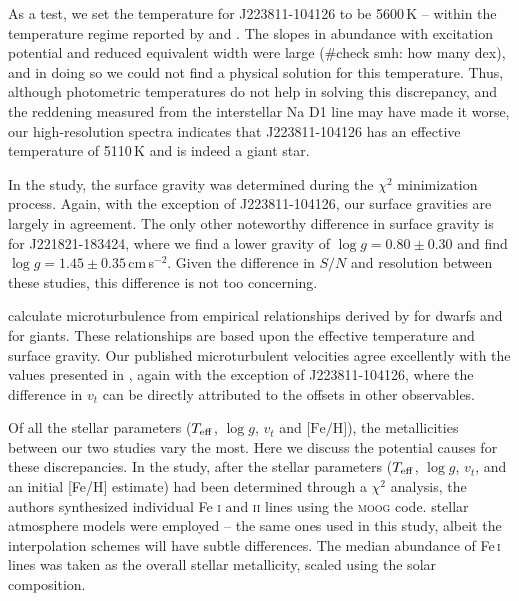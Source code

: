\documentclass{emulateapj}
\begin{document}
As a test, we set the temperature for J223811-104126 to be 5600\,K -- within the temperature regime reported by \citet{williams;et-al_2011} and \citet{wylie-de-boer;et-al_2012}. The slopes in abundance with excitation potential and reduced equivalent width were large (\#check smh: how many dex), and in doing so we could not find a physical solution for this temperature. Thus, although photometric temperatures do not help in solving this discrepancy, and the reddening measured from the interstellar Na D1 line may have made it worse, our high-resolution spectra indicates that J223811-104126 has an effective temperature of 5110\,K and is indeed a giant star.

In the \citet{wylie-de-boer;et-al_2012} study, the surface gravity was determined during the $\chi^2$ minimization process. Again, with the exception of J223811-104126, our surface gravities are largely in agreement. The only other noteworthy difference in surface gravity is for J221821-183424, where we find a lower gravity of $\log{g} = 0.80 \pm 0.30$ and \citet{wylie-de-boer;et-al_2012} find $\log{g} = 1.45 \pm 0.35$\,cm\,s$^{-2}$. Given the difference in $S/N$ and resolution between these studies, this difference is not too concerning. 

\citet{wylie-de-boer;et-al_2012} calculate microturbulence from empirical relationships derived by \citet{reddy;et-al_2003} for dwarfs and \citet{fulbright_2000} for giants. These relationships are based upon the effective temperature and surface gravity. Our published microturbulent velocities agree excellently with the values presented in \citet{wylie-de-boer;et-al_2012}, again with the exception of J223811-104126, where the difference in $v_{t}$ can be directly attributed to the offsets in other observables.


Of all the stellar parameters ($T_{\rm eff}$, $\log{g}$, $v_{t}$ and $\mbox{[Fe/H]}$), the metallicities between our two studies vary the most. Here we discuss the potential causes for these discrepancies. In the \citet{wylie-de-boer;et-al_2012} study, after the stellar parameters ($T_{\rm eff}$, $\log{g}$, $v_{t}$, and an initial [Fe/H] estimate) had been determined through a $\chi^2$ analysis, the authors synthesized individual Fe \textsc{i} and \textsc{ii} lines using the \textsc{moog} code. \citet{castelli;kurucz_2003} stellar atmosphere models were employed \--- the same ones used in this study, albeit the interpolation schemes will have subtle differences. The median abundance of Fe\,\textsc{i} lines was taken as the overall stellar metallicity, scaled using the \citet{grevesse;sauval_1998} solar composition.
\end{document}
